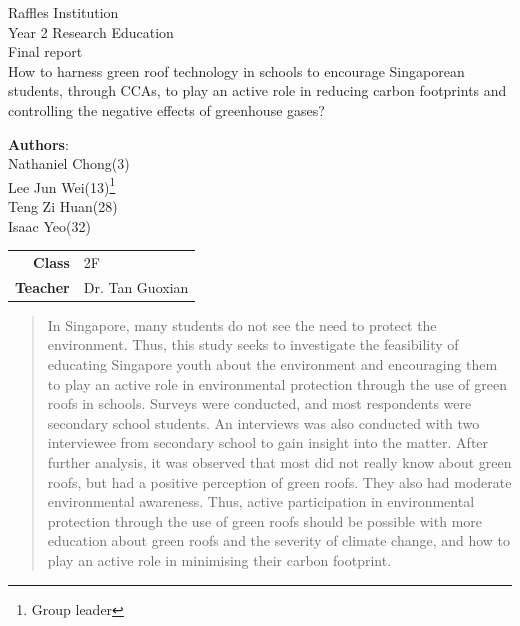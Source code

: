 \documentclass[a4paper]{article}
\begin{document}
\begin{titlepage}
  \begin{center}
    \Large{Raffles Institution \\ Year 2 Research Education \\ Final report} \\
    \vspace{1cm}
    \huge{How to harness green roof technology in schools to encourage
      Singaporean students, through CCAs, to play an active role in reducing
      carbon footprints and controlling the negative effects of greenhouse
      gases?
    } \\
    \vspace{1cm}
    \large{
      \textbf{Authors}: \\
      Nathaniel Chong(3) \\
      Lee Jun Wei(13)\footnote{Group leader} \\
      Teng Zi Huan(28) \\
      Isaac Yeo(32) \\
      \vspace{1cm}
      \begin{tabular}{r@{:}l}
        \textbf{Class} & \hspace{1cm} 2F \\
        \textbf{Teacher} & \hspace{1cm} Dr. Tan Guoxian \\
      \end{tabular}
    }
  \end{center}
\end{titlepage}

\newpage

\begin{abstract}
  \noindent
  In Singapore, many students do not see the need to protect the
  environment. Thus, this study seeks to investigate the feasibility of
  educating Singapore youth about the environment and encouraging them
  to play an active role in environmental protection through the use of
  green roofs in schools. Surveys were conducted, and most respondents
  were secondary school students. An interviews was also conducted
  with two interviewee from secondary school to gain insight into
  the matter. After further analysis, it was observed that most did
  not really know about green roofs, but had a positive perception of
  green roofs. They also had moderate environmental awareness. Thus,
  active participation in environmental protection through the use
  of green roofs should be possible with more education about green
  roofs and the severity of climate change, and how to play an active
  role in minimising their carbon footprint.
\end{abstract}
\end{document}
